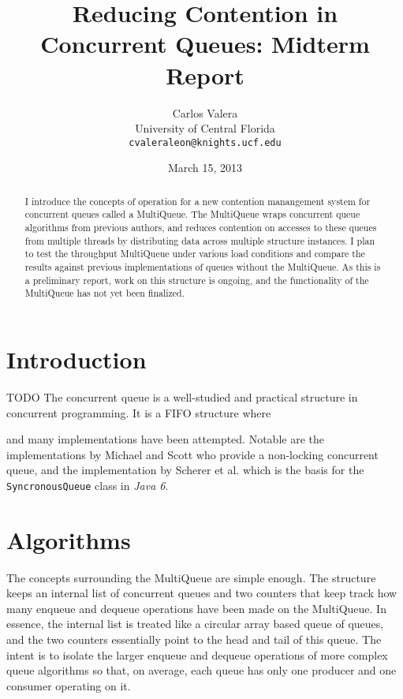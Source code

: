 \documentclass[12pt]{report}
\begin{document}
\title{Reducing Contention in Concurrent Queues: Midterm Report}
\author{Carlos Valera \\
    University of Central Florida \\
    \texttt{cvaleraleon@knights.ucf.edu}}
\date{March 15, 2013}
\maketitle
\begin{abstract}
I introduce the concepts of operation for a new contention manangement system
for concurrent queues called a MultiQueue. The MultiQueue wraps concurrent
queue algorithms from previous authors, and reduces contention on accesses to
these queues from multiple threads by distributing data across multiple
structure instances. I plan to test the throughput MultiQueue under various
load conditions and compare the results against previous implementations of
queues without the MultiQueue.  As this is a preliminary report, work on this
structure is ongoing, and the functionality of the MultiQueue has not yet been
finalized.
\end{abstract}
\section{Introduction}
TODO
The concurrent queue is a well-studied and practical structure in concurrent
programming. It is a FIFO structure where 

and many implementations have been attempted. Notable are the implementations
by Michael and Scott\cite{michael1996} who provide a non-locking concurrent
queue, and the implementation by Scherer et al.\cite{scherer2009} which is the
basis for the \texttt{SyncronousQueue} class in \emph{Java 6}.

\section{Algorithms}
The concepts surrounding the MultiQueue are simple enough. The structure keeps
an internal list of concurrent queues and two counters that keep track how many
enqueue and dequeue operations have been made on the MultiQueue. In essence,
the internal list is treated like a circular array based queue of queues, and
the two counters essentially point to the head and tail of this queue. The
intent is to isolate the larger enqueue and dequeue operations of more complex
queue algorithms so that, on average, each queue has only one producer and one
consumer operating on it.
\end{document}
